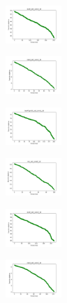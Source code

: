 \begin{figure}[H]
\begin{subfigure}
        \centering
        \includegraphics[width=0.234\textwidth]{img/bl/ecoli_set_const_10_589741062_cost.png}
    \end{subfigure}
    \hfill
    \begin{subfigure}
        \centering
        \includegraphics[width=0.234\textwidth]{img/bl/rand_set_const_10_589741062_cost.png}
    \end{subfigure}
    \hfill
    \begin{subfigure}
        \centering
        \includegraphics[width=0.234\textwidth]{img/bl/newthyroid_set_const_10_589741062_cost.png}
    \end{subfigure}
    \hfill
    \begin{subfigure}
        \centering
        \includegraphics[width=0.234\textwidth]{img/bl/iris_set_const_10_277451237_cost.png}
    \end{subfigure}
    \hfill
    \begin{subfigure}
        \centering
        \includegraphics[width=0.234\textwidth]{img/bl/ecoli_set_const_10_277451237_cost.png}
    \end{subfigure}
    \hfill
    \begin{subfigure}
        \centering
        \includegraphics[width=0.234\textwidth]{img/bl/rand_set_const_10_277451237_cost.png}

\end{subfigure}
\end{figure}
